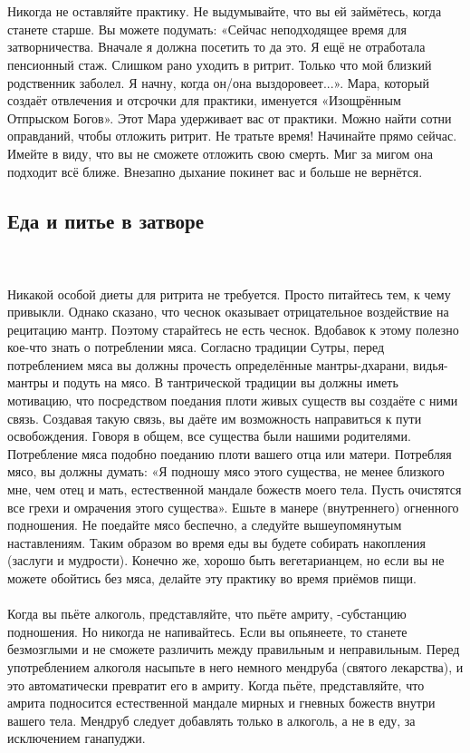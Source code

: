 \\ \\ Никогда не оставляйте практику. Не выдумывайте, что вы ей займётесь, когда станете старше. Вы можете подумать: «Сейчас неподходящее время для затворничества. Вначале я должна посетить то да это. Я ещё не отработала пенсионный стаж. Слишком рано уходить в ритрит. Только что мой близкий родственник заболел. Я начну, когда он/она выздоровеет...». Мара, который создаёт отвлечения и отсрочки для практики, именуется «Изощрённым Отпрыском Богов». Этот Мара удерживает вас от практики. Можно найти сотни оправданий, чтобы отложить ритрит. Не тратьте время! Начинайте прямо сейчас. Имейте в виду, что вы не сможете отложить свою смерть. Миг за мигом она подходит всё ближе. Внезапно дыхание покинет вас и больше не вернётся.
\subsection{Еда и питье в затворе}
\\ \\ Никакой особой диеты для ритрита не требуется. Просто питайтесь тем, к чему привыкли. Однако сказано, что чеснок оказывает отрицательное воздействие на рецитацию мантр. Поэтому старайтесь не есть чеснок. Вдобавок к этому полезно кое-что знать о потреблении мяса. Согласно традиции Сутры, перед потреблением мяса вы должны прочесть определённые мантры-дхарани, видья-мантры и подуть на мясо. В тантрической традиции вы должны иметь мотивацию, что посредством поедания плоти живых существ вы создаёте с ними связь. Создавая такую связь, вы даёте им возможность направиться к пути освобождения. Говоря в общем, все существа были нашими родителями. Потребление мяса подобно поеданию плоти вашего отца или матери. Потребляя мясо, вы должны думать: «Я подношу мясо этого существа, не менее близкого мне, чем отец и мать, естественной мандале божеств моего тела. Пусть очистятся все грехи и омрачения этого существа». Ешьте в манере (внутреннего) огненного подношения. Не поедайте мясо беспечно, а следуйте вышеупомянутым наставлениям. Таким образом во время еды вы будете собирать накопления (заслуги и мудрости). Конечно же, хорошо быть вегетарианцем, но если вы не можете обойтись без мяса, делайте эту практику во время приёмов пищи.
\\ \\ Когда вы пьёте алкоголь, представляйте, что пьёте амриту, -субстанцию подношения. Но никогда не напивайтесь. Если вы опьянеете, то станете безмозглыми и не сможете различить между правильным и неправильным. Перед употреблением алкоголя насыпьте в него немного мендруба (святого лекарства), и это автоматически превратит его в амриту. Когда пьёте, представляйте, что амрита подносится естественной мандале мирных и гневных божеств внутри вашего тела. Мендруб следует добавлять только в алкоголь, а не в еду, за исключением ганапуджи.
